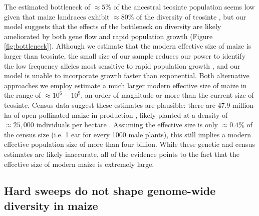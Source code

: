 \documentclass{pnastwo}
\begin{document}
\begin{article}
The estimated bottleneck of $\approx 5\%$ of the ancestral teosinte population seems low given that maize landraces exhibit $\approx 80\%$ of the diversity of teosinte \cite{hufford2012}, but our model suggests that the effects of the bottleneck on diversity are likely ameliorated by both gene flow and rapid population growth (Figure \ref{fig:bottleneck}).   
Although we estimate that the modern effective size of maize is larger than teosinte, the small size of our sample reduces our power to identify the low frequency alleles most sensitive to rapid population growth \cite{keinan2012}, and our model is unable to incorporate growth faster than exponential.  
Both alternative approaches we employ estimate a much larger modern effective size of maize in the range of $\approx 10^6 - 10^9$, an order of magnitude or more than the current size of teosinte.
Census data suggest these estimates are plausible: there are 47.9 million ha of open-pollinated maize in production \cite{cimmyt1999}, likely planted at a density of $\approx 25,000$ individuals per hectare \cite{baden2001}.
Assuming the effective size is only $\approx 0.4\%$ of the census size (i.e. 1 ear for every 1000 male plants), this still implies a modern effective population size of more than four billion.
While these genetic and census estimates are likely inaccurate, all of the evidence points to the fact that the effective size of modern maize is extremely large.


\subsection{Hard sweeps do not shape genome-wide diversity in maize} %


\end{article}
\end{document}
